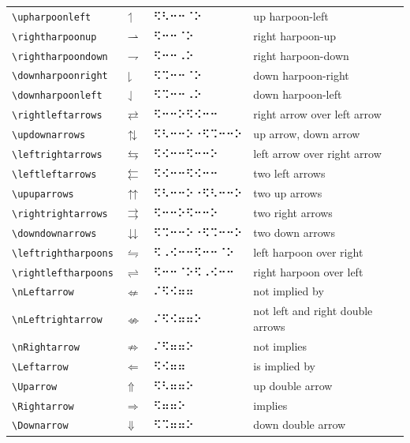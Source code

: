 \documentclass[oneside]{article}
\begin{document}
\begin{longtable}{llll}
\verb|\upharpoonleft| & $\upharpoonleft$ &   ⠫⠣⠒⠒⠈⠕   & {up harpoon-left} \\[2ex]
\verb|\rightharpoonup| & $\rightharpoonup$ &   ⠫⠒⠒⠈⠕   & {right harpoon-up} \\[2ex]
\verb|\rightharpoondown| & $\rightharpoondown$ &   ⠫⠒⠒⠠⠕   & {right harpoon-down} \\[2ex]
\verb|\downharpoonright| & $\downharpoonright$ &   ⠫⠩⠒⠒⠈⠕   & {down harpoon-right} \\[2ex]
\verb|\downharpoonleft| & $\downharpoonleft$ &   ⠫⠩⠒⠒⠠⠕   & {down harpoon-left} \\[2ex]
\verb|\rightleftarrows| & $\rightleftarrows$ &   ⠫⠒⠒⠕⠫⠪⠒⠒   & {right arrow over left arrow} \\[2ex]
\verb|\updownarrows| & $\updownarrows$ &   ⠫⠣⠒⠒⠕⠐⠫⠩⠒⠒⠕   & {up arrow, down arrow} \\[2ex]
\verb|\leftrightarrows| & $\leftrightarrows$ &   ⠫⠪⠒⠒⠫⠒⠒⠕   & {left arrow over right arrow} \\[2ex]
\verb|\leftleftarrows| & $\leftleftarrows$ &   ⠫⠪⠒⠒⠫⠪⠒⠒   & {two left arrows} \\[2ex]
\verb|\upuparrows| & $\upuparrows$ &   ⠫⠣⠒⠒⠕⠐⠫⠣⠒⠒⠕   & {two up arrows} \\[2ex]
\verb|\rightrightarrows| & $\rightrightarrows$ &   ⠫⠒⠒⠕⠫⠒⠒⠕   & {two right arrows} \\[2ex]
\verb|\downdownarrows| & $\downdownarrows$ &   ⠫⠩⠒⠒⠕⠐⠫⠩⠒⠒⠕   & {two down arrows} \\[2ex]
\verb|\leftrightharpoons| & $\leftrightharpoons$ &   ⠫⠠⠪⠒⠒⠫⠒⠒⠈⠕   & {left harpoon over right} \\[2ex]
\verb|\rightleftharpoons| & $\rightleftharpoons$ &   ⠫⠒⠒⠈⠕⠫⠠⠪⠒⠒   & {right harpoon over left} \\[2ex]
\verb|\nLeftarrow| & $\nLeftarrow$ &   ⠌⠫⠪⠶⠶   & {not implied by} \\[2ex]
\verb|\nLeftrightarrow| & $\nLeftrightarrow$ &   ⠌⠫⠪⠶⠶⠕   & {not left and right double arrows} \\[2ex]
\verb|\nRightarrow| & $\nRightarrow$ &   ⠌⠫⠶⠶⠕   & {not implies} \\[2ex]
\verb|\Leftarrow| & $\Leftarrow$ &   ⠫⠪⠶⠶   & {is implied by} \\[2ex]
\verb|\Uparrow| & $\Uparrow$ &   ⠫⠣⠶⠶⠕   & {up double arrow} \\[2ex]
\verb|\Rightarrow| & $\Rightarrow$ &   ⠫⠶⠶⠕   & {implies} \\[2ex]
\verb|\Downarrow| & $\Downarrow$ &   ⠫⠩⠶⠶⠕   & {down double arrow} \\[2ex]

\end{longtable}
\end{document}
